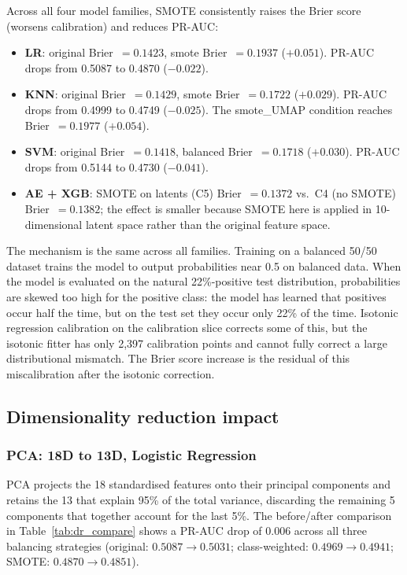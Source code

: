 \documentclass[12pt,a4paper]{article}
\begin{document}
Across all four model families, SMOTE consistently raises the Brier score
(worsens calibration) and reduces PR-AUC:

\begin{itemize}
  \item \textbf{LR}: original Brier~$= 0.1423$, smote Brier~$= 0.1937$ ($+0.051$).
        PR-AUC drops from 0.5087 to 0.4870 ($-0.022$).
  \item \textbf{KNN}: original Brier~$= 0.1429$, smote Brier~$= 0.1722$ ($+0.029$).
        PR-AUC drops from 0.4999 to 0.4749 ($-0.025$). The smote\_UMAP condition
        reaches Brier~$= 0.1977$ ($+0.054$).
  \item \textbf{SVM}: original Brier~$= 0.1418$, balanced Brier~$= 0.1718$ ($+0.030$).
        PR-AUC drops from 0.5144 to 0.4730 ($-0.041$).
  \item \textbf{AE + XGB}: SMOTE on latents (C5) Brier~$= 0.1372$ vs.\ C4 (no SMOTE)
        Brier~$= 0.1382$; the effect is smaller because SMOTE here is applied
        in 10-dimensional latent space rather than the original feature space.
\end{itemize}

The mechanism is the same across all families. Training on a balanced 50/50
dataset trains the model to output probabilities near 0.5 on balanced data.
When the model is evaluated on the natural 22\%-positive test distribution,
probabilities are skewed too high for the positive class: the model has
learned that positives occur half the time, but on the test set they occur
only 22\% of the time. Isotonic regression calibration on the calibration
slice corrects some of this, but the isotonic fitter has only 2,397
calibration points and cannot fully correct a large distributional mismatch.
The Brier score increase is the residual of this miscalibration after the
isotonic correction.

\subsection{Dimensionality reduction impact}

\subsubsection*{PCA: 18D to 13D, Logistic Regression}

PCA projects the 18 standardised features onto their principal components and
retains the 13 that explain 95\% of the total variance, discarding the
remaining 5 components that together account for the last 5\%. The before/after
comparison in Table~\ref{tab:dr_compare} shows a PR-AUC drop of 0.006 across
all three balancing strategies (original: $0.5087 \to 0.5031$;
class-weighted: $0.4969 \to 0.4941$; SMOTE: $0.4870 \to 0.4851$).
\end{document}
